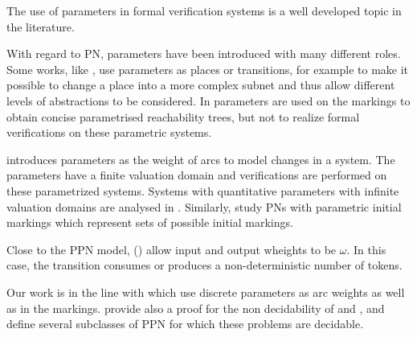 The use of parameters in formal verification systems is a well developed topic in the literature.

With regard to \ac{PN}, parameters have been introduced with many different roles.
Some works, like \cite{Christensen97}, use parameters as places or transitions, for example to make it possible to change a place into a more complex subnet and thus allow different levels of abstractions to be considered.
In \cite{Lindqvist91} parameters are used on the markings to obtain concise parametrised reachability trees, but not to realize formal verifications on these parametric systems.

\cite{Badouel99} introduces parameters as the weight of arcs to model changes in a system.
The parameters have a finite valuation domain and verifications are performed on these parametrized systems.
Systems with quantitative parameters with infinite valuation domains are analysed in \cite{Abdulla13}.
Similarly, \cite{Marsan94} study \acp{PN} with parametric initial markings which represent sets of possible initial markings.

Close to the \ac{PPN} model, \opns (\cite{Geeraerts15}) allow input and output wheights to be $\omega$. In this case, the transition consumes or produces a non-deterministic number of tokens.

Our work is in the line with \cite{David17} which use discrete parameters as arc weights as well as in the markings.
\cite{David17} provide also a proof for the non decidability of \Ucov and \Ecov, and define several subclasses of \ac{PPN} for which these problems are decidable.

